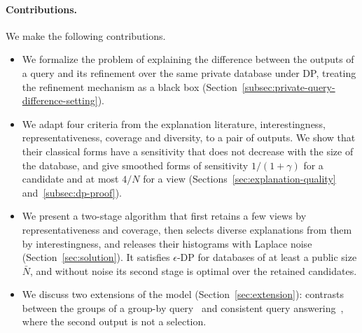 \paragraph{Contributions.}
We make the following contributions.
\begin{itemize}[leftmargin=*]
\item We formalize the problem of explaining the difference between the outputs of a query and its refinement over the same private database under DP, treating the refinement mechanism as a black box (Section~\ref{subsec:private-query-difference-setting}).
\item We adapt four criteria from the explanation literature, interestingness, representativeness, coverage and diversity, to a pair of outputs. We show that their classical forms have a sensitivity that does not decrease with the size of the database, and give smoothed forms of sensitivity $1/(1+\gamma)$ for a candidate and at most $4/N$ for a view (Sections~\ref{sec:explanation-quality} and~\ref{subsec:dp-proof}).
\item We present a two-stage algorithm that first retains a few views by representativeness and coverage, then selects diverse explanations from them by interestingness, and releases their histograms with Laplace noise (Section~\ref{sec:solution}). It satisfies $\epsilon$-DP for databases of at least a public size $\bar N$, and without noise its second stage is optimal over the retained candidates.
\item We discuss two extensions of the model (Section~\ref{sec:extension}): contrasts between the groups of a group-by query~\cite{TaoGMR22} and consistent query answering~\cite{arenas1999,bertossi2011}, where the second output is not a selection.

\end{itemize}
